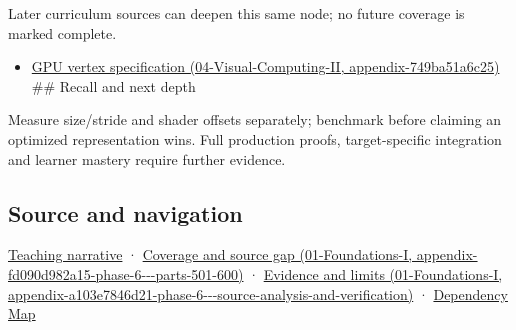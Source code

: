 Later curriculum sources can deepen this same node; no future coverage is marked complete.

\begin{itemize}
\tightlist
\item
  \href{../04-Visual-Computing-II/main.pdf\#nameddest=appendix-749ba51a6c25}{GPU vertex specification (04-Visual-Computing-II, appendix-749ba51a6c25)} \#\# Recall and next depth
\end{itemize}

Measure size/stride and shader offsets separately; benchmark before claiming an optimized representation wins. Full production proofs, target-specific integration and learner mastery require further evidence.

\subsection{Source and navigation}\label{appendix-26bf6bf2fb8b-source-and-navigation}

\hyperref[02-foundations-ii-ch037-storage-and-computation-can-choose-different-layouts]{Teaching narrative} · \href{../01-Foundations-I/main.pdf\#nameddest=appendix-fd090d982a15-phase-6---parts-501-600}{Coverage and source gap (01-Foundations-I, appendix-fd090d982a15-phase-6-\/-\/-parts-501-600)} · \href{../01-Foundations-I/main.pdf\#nameddest=appendix-a103e7846d21-phase-6---source-analysis-and-verification}{Evidence and limits (01-Foundations-I, appendix-a103e7846d21-phase-6-\/-\/-source-analysis-and-verification)} · \hyperref[appendix-4ad47bdd269a]{Dependency Map}
